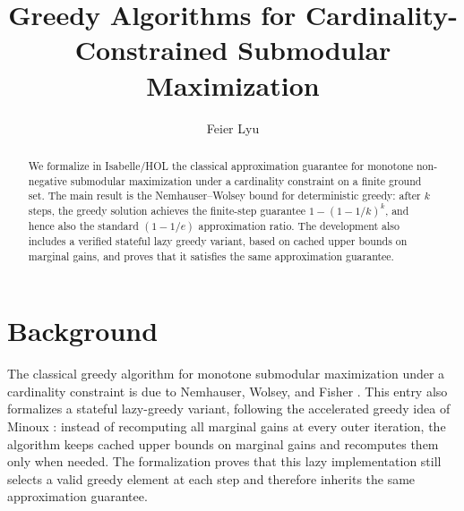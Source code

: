 \documentclass[11pt,a4paper]{article}
\begin{document}
\title{Greedy Algorithms for Cardinality-Constrained Submodular Maximization}
\author{Feier Lyu}
\maketitle

\begin{abstract}
We formalize in Isabelle/HOL the classical approximation guarantee for monotone
non-negative submodular maximization under a cardinality constraint on a finite
ground set. The main result is the Nemhauser--Wolsey bound for deterministic
greedy: after $k$ steps, the greedy solution achieves the finite-step guarantee
$1 - (1 - 1/k)^k$, and hence also the standard $(1 - 1/e)$ approximation ratio.
The development also includes a verified stateful lazy greedy variant, based on
cached upper bounds on marginal gains, and proves that it satisfies the same
approximation guarantee.
\end{abstract}

\tableofcontents

\section*{Background}

The classical greedy algorithm for monotone submodular maximization under a
cardinality constraint is due to Nemhauser, Wolsey, and Fisher
\cite{NemhauserWolseyFisher1978}.  This entry also formalizes a stateful
lazy-greedy variant, following the accelerated greedy idea of Minoux
\cite{Minoux1978}: instead of recomputing all marginal gains at every outer
iteration, the algorithm keeps cached upper bounds on marginal gains and
recomputes them only when needed.  The formalization proves that this lazy
implementation still selects a valid greedy element at each step and therefore
inherits the same approximation guarantee.



\nocite{NemhauserWolseyFisher1978}
\nocite{Minoux1978}



\end{document}
